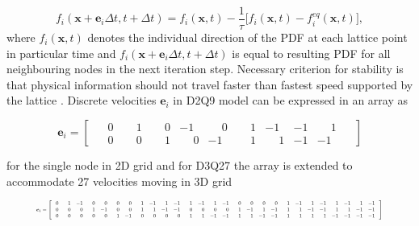 \begin{equation}
	\label{eq:lbe-bgk}
	f_i (\bm{x}+\bm{e}_i\Delta t,t+\Delta t) = f_i (\bm{x},t)-\frac{1}{\tau}\Big[f_i (\bm{x},t) - f_i^{eq} (\bm{x},t)\Big],
\end{equation}
where $f_i (\bm{x},t)$ denotes the individual direction of the PDF at each lattice point in particular time and $f_i (\bm{x}+\bm{e}_i\Delta t,t+\Delta t)$ is equal to resulting PDF for all neighbouring nodes in the next iteration step. Necessary criterion for stability is that physical information should not travel faster than fastest speed supported by the lattice \citep{succi2001lattice}. Discrete velocities $\bm{e}_i$ in D2Q9 model can be expressed in an array as

\begin{equation}
	\label{discrete-velocities}
	\bm{e}_i = \begin{bmatrix}
		\phantom{-}0 & \phantom{-}1 & \phantom{-}0 &-1 & \phantom{-}0 & \phantom{-}1 &-1 &-1 & \phantom{-}1\phantom{-}\\
		\phantom{-}0 & \phantom{-}0 & \phantom{-}1 & \phantom{-}0 &-1 & \phantom{-}1 & \phantom{-}1 &-1 &-1\phantom{-}
	\end{bmatrix}
\end{equation}

for the single node in 2D grid and for D3Q27 the array is extended to accommodate 27 velocities moving in 3D grid

\begin{equation}
	\label{discrete-velocities-3d}
	\resizebox{0.89\textwidth}{!}{$\bm{e}_i = \left[ \begin{array}{@{}*{27}{c}@{}}
			\phantom{-}0 & \phantom{-}1 &-1 & \phantom{-}0 & \phantom{-}0 & \phantom{-}0 & \phantom{-}0 & \phantom{-}1 &-1 & \phantom{-}1 &-1 & \phantom{-}1 &-1 & \phantom{-}1 &-1 & \phantom{-}0 & \phantom{-}0 & \phantom{-}0 & \phantom{-}0 & \phantom{-}1&-1 & \phantom{-}1 &-1 & \phantom{-}1 &-1 & \phantom{-}1 &-1 \phantom{-} \\
			\phantom{-}0 & \phantom{-}0 & \phantom{-}0 & \phantom{-}1 &-1 & \phantom{-}0 & \phantom{-}0 & \phantom{-}1 & \phantom{-}1 &-1 &-1 & \phantom{-}0 & \phantom{-}0 & \phantom{-}0 & \phantom{-}0 & \phantom{-}1 &-1 & \phantom{-}1 &-1 & \phantom{-}1 & \phantom{-}1 &-1 &-1 & \phantom{-}1 & \phantom{-}1 &-1 &-1 \phantom{-} \\
			\phantom{-}0 & \phantom{-}0 & \phantom{-}0 & \phantom{-}0 & \phantom{-}0 & \phantom{-}1 &-1 & \phantom{-}0 & \phantom{-}0 & \phantom{-}0 & \phantom{-}0 & \phantom{-}1 & \phantom{-}1 &-1 &-1 & \phantom{-}1 & \phantom{-}1 &-1 &-1 & \phantom{-}1 & \phantom{-}1 & \phantom{-}1 & \phantom{-}1 &-1 &-1 &-1 &-1\phantom{-}
		\end{array} \right]$}
\end{equation}

